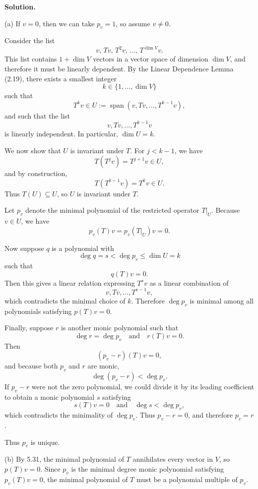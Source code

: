\documentclass[11pt]{article}
\newcommand{\SolutionAnnounce}{\noindent\textbf{Solution.}\par\medskip}
\begin{document}
\begin{solutionBox}
\SolutionAnnounce
\doublespacing

(a) If $v = 0$, then we can take $p_v = 1$, so assume $v \neq 0$.

Consider the list
\[
v,\, Tv,\, T^2v,\, \dots,\, T^{\dim V}v.
\]
This list contains $1 + \dim V$ vectors in a vector space of dimension $\dim V$, and therefore it must be linearly dependent. By the Linear Dependence Lemma (2.19), there exists a smallest integer
\[
k \in \{1,\dots,\dim V\}
\]
such that
\[
T^k v \in U := \operatorname{span}(v, Tv, \dots, T^{k-1}v),
\]
and such that the list
\[
v, Tv, \dots, T^{k-1}v
\]
is linearly independent. In particular, $\dim U = k$.

We now show that $U$ is invariant under $T$. For $j < k-1$, we have
\[
T(T^j v) = T^{j+1}v \in U,
\]
and by construction,
\[
T(T^{k-1}v) = T^k v \in U.
\]
Thus $T(U) \subseteq U$, so $U$ is invariant under $T$.

Let $p_v$ denote the minimal polynomial of the restricted operator $T|_U$. Because $v \in U$, we have
\[
p_v(T)v = p_v(T|_U)v = 0.
\]

Now suppose $q$ is a polynomial with
\[
\deg q = s < \deg p_v \le \dim U = k
\]
such that
\[
q(T)v = 0.
\]
Then this gives a linear relation expressing $T^s v$ as a linear combination of
\[
v, Tv, \dots, T^{s-1}v,
\]
which contradicts the minimal choice of $k$. Therefore $\deg p_v$ is minimal among all polynomials satisfying $p(T)v = 0$.

Finally, suppose $r$ is another monic polynomial such that
\[
\deg r = \deg p_v
\quad \text{and} \quad
r(T)v = 0.
\]
Then
\[
(p_v - r)(T)v = 0,
\]
and because both $p_v$ and $r$ are monic,
\[
\deg(p_v - r) < \deg p_v.
\]
If $p_v - r$ were not the zero polynomial, we could divide it by its leading coefficient to obtain a monic polynomial $s$ satisfying
\[
s(T)v = 0
\quad \text{and} \quad
\deg s < \deg p_v,
\]
which contradicts the minimality of $\deg p_v$. Thus $p_v - r = 0$, and therefore $p_v = r$.

Thus $p_v$ is unique.

(b) By 5.31, the minimal polynomial of $T$ annihilates every vector in $V$, so $p(T)v = 0$. Since $p_v$ is the minimal degree monic polynomial satisfying $p_v(T)v = 0$, the minimal polynomial of $T$ must be a polynomial multiple of $p_v$.

\end{solutionBox}

\newpage
\end{document}

